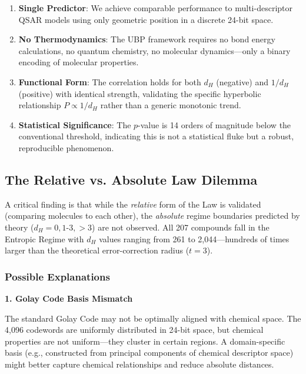 \documentclass[11pt,letterpaper]{article}
\begin{document}
\begin{enumerate}
    \item \textbf{Single Predictor}: We achieve comparable performance to multi-descriptor QSAR models \cite{QSARBiodeg2024} using only geometric position in a discrete 24-bit space.

    \item \textbf{No Thermodynamics}: The UBP framework requires no bond energy calculations, no quantum chemistry, no molecular dynamics—only a binary encoding of molecular properties.

    \item \textbf{Functional Form}: The correlation holds for both $d_H$ (negative) and $1/d_H$ (positive) with identical strength, validating the specific hyperbolic relationship $P \propto 1/d_H$ rather than a generic monotonic trend.

    \item \textbf{Statistical Significance}: The $p$-value is 14 orders of magnitude below the conventional threshold, indicating this is not a statistical fluke but a robust, reproducible phenomenon.
\end{enumerate}

\subsection{The Relative vs. Absolute Law Dilemma}

A critical finding is that while the \textit{relative} form of the Law is validated (comparing molecules to each other), the \textit{absolute} regime boundaries predicted by theory ($d_H = 0, 1$-$3, >3$) are not observed. All 207 compounds fall in the Entropic Regime with $d_H$ values ranging from 261 to 2,044—hundreds of times larger than the theoretical error-correction radius ($t=3$).

\subsubsection{Possible Explanations}

\textbf{1. Golay Code Basis Mismatch}

The standard Golay Code may not be optimally aligned with chemical space. The 4,096 codewords are uniformly distributed in 24-bit space, but chemical properties are not uniform—they cluster in certain regions. A domain-specific basis (e.g., constructed from principal components of chemical descriptor space) might better capture chemical relationships and reduce absolute distances.
\end{document}
